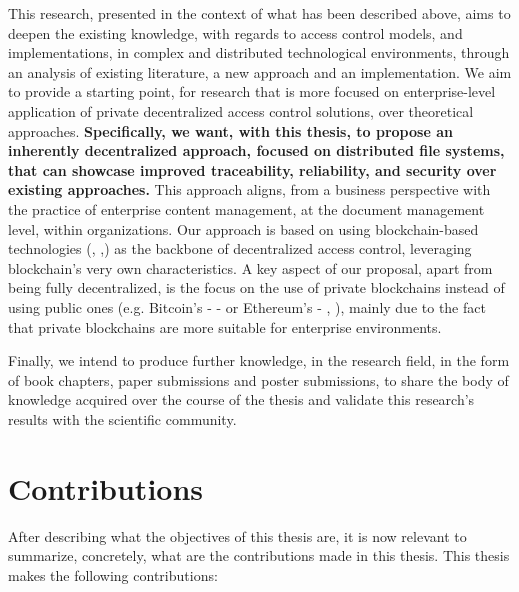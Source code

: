 This research, presented in the context of what has been described above, aims to deepen the existing knowledge, with regards to access control models, and implementations, in complex and distributed technological environments, through an analysis of existing literature, a new approach and an implementation. We aim to provide a starting point, for research that is more focused on enterprise-level application of private decentralized access control solutions, over theoretical approaches. \textbf{Specifically, we want, with this thesis, to propose an inherently decentralized approach, focused on distributed file systems, that can showcase improved traceability, reliability, and security over existing approaches.} This approach aligns, from a business perspective with the practice of enterprise content management, at the document management level, within organizations. Our approach is based on using blockchain-based technologies (\cite{nakamoto_bitcoin:_2008}, \cite{buterin_next-generation_2013},\cite{wood_ethereum:_2014}) as the backbone of decentralized access control, leveraging blockchain's very own characteristics. A key aspect of our proposal, apart from being fully decentralized, is the focus on the use of private blockchains instead of using public ones (e.g. Bitcoin's - \cite{nakamoto_bitcoin:_2008} - or Ethereum's - \cite{buterin_next-generation_2013}, \cite{wood_ethereum:_2014}), mainly due to the fact that private blockchains are more suitable for enterprise environments.

Finally, we intend to produce further knowledge, in the research field, in the form of book chapters, paper submissions and poster submissions, to share the body of knowledge acquired over the course of the thesis and validate this research's results with the scientific community.

\section{Contributions}
\label{sec:contributions}

After describing what the objectives of this thesis are, it is now relevant to summarize, concretely, what are the contributions made in this thesis. This thesis makes the following contributions:


